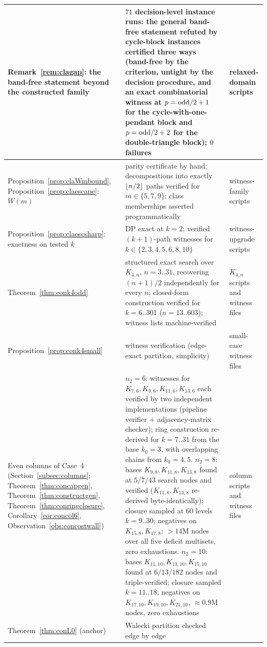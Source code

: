\begin{longtable}{p{4.6cm} p{6.2cm} p{4.2cm}}
\hline
Remark~\ref{rem:clagap}: the band-free statement beyond the constructed
family & $71$ decision-level instance runs: the general band-free
statement refuted by cycle-block instances certified three ways
(band-free by the criterion, untight by the decision procedure, and an
exact combinatorial witness at $p=\mathrm{odd}/2+1$ for the
cycle-with-one-pendant block and $p=\mathrm{odd}/2+2$ for the
double-triangle block); $0$ failures & relaxed-domain scripts\\
\hline
Proposition~\ref{prop:claWmbound}, Proposition~\ref{prop:claescape}:
$W(m)$ & parity certificate by hand; decompositions into exactly
$\left\lfloor n/2 \right\rfloor$ paths verified for $m\in\{5,7,9\}$; class memberships
asserted programmatically & witness-family scripts\\
\hline
Proposition~\ref{prop:claoscsharp}: exactness on tested $k$ & DP exact at
$k=2$; verified $(k+1)$-path witnesses for $k\in\{2,3,4,5,6,8,10\}$ &
witness-upgrade scripts\\
\hline
Theorem~\ref{thm:conk4odd} & structured exact search over $K_{4,n}$,
$n=3..31$, recovering $(n+1)/2$ independently for every $n$; closed-form
construction verified for $k=6..301$ ($n=13..603$); witness lists
machine-verified & $K_{4,n}$ scripts and witness files\\
\hline
Proposition~\ref{prop:conk4small} & witness verification (edge-exact
partition, simplicity) & small-case witness files\\
\hline
Even columns of Case~4 (Section~\ref{subsec:columns};
Theorem~\ref{thm:concapgen}, Theorem~\ref{thm:constructgen},
Theorem~\ref{thm:conringclosure}, Corollary~\ref{cor:concol6},
Observation~\ref{obs:concostwall}) & $n_2=6$: witnesses for
$K_{7,6},K_{9,6},K_{11,6},K_{13,6}$ each verified by two independent
implementations (pipeline verifier $+$ adjacency-matrix checker); ring
construction re-derived for $k=7..31$ from the base $k_0=3$, with
overlapping chains from $k_0=4,5$. $n_2=8$: bases
$K_{9,8},K_{11,8},K_{13,8}$ found at $5/7/43$ search nodes and verified
($K_{11,8},K_{13,8}$ re-derived byte-identically); closure sampled at
$60$ levels $k=9..30$; negatives on $K_{15,8},K_{17,8}$: $>14$M nodes
over all five deficit multisets, zero exhaustions. $n_2=10$: bases
$K_{11,10},K_{13,10},K_{15,10}$ found at $6/13/182$ nodes and
triple-verified; closure sampled $k=11..18$; negatives on
$K_{17,10},K_{19,10},K_{21,10}$, $\approx0.9$M nodes, zero exhaustions &
column scripts and witness files\\
\hline
Theorem~\ref{thm:conL0} (anchor) & Walecki partition checked edge by edge

\end{longtable}
